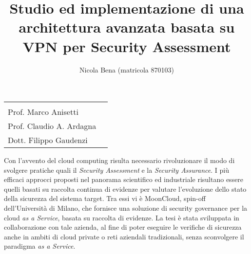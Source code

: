 \documentclass[10pt,a4paper]{article}
\begin{document}
        \title{\textbf{Studio ed implementazione di una architettura avanzata
        basata su VPN per Security Assessment}}
        \author{Nicola Bena (matricola 870103)}
        \date{}

        \maketitle

        \vspace{0.5cm}

        \begin{minipage}{\linewidth}
            \begin{tabular}{l r}
                \begin{minipage}[t]{.4\linewidth}
                    \begin{flushleft}
                        {%
                            RELATORE\\[.15cm]
                            Prof. Marco Anisetti
                        }
                    \end{flushleft}
                \end{minipage}
                &
                \begin{minipage}[t]{.53\linewidth}
                    \begin{flushright}
                        {%
                            CORRELATORI\\[.15cm]
                            Prof. Claudio A. Ardagna\\[.1cm]
                            Dott. Filippo Gaudenzi
                        }
                    \end{flushright}
                \end{minipage}
            \end{tabular}
        \end{minipage}

        \vspace{2cm}

        Con l'avvento del cloud computing risulta necessario rivoluzionare il modo di svolgere pratiche quali il
        \textit{Security Assessment} e la \textit{Security Assurance}. I più efficaci approcci
        proposti nel panorama scientifico ed industriale risultano essere quelli basati su raccolta continua
        di evidenze per valutare l'evoluzione dello stato della sicurezza del sistema target.
        Tra essi vi è MoonCloud, spin-off dell'Università di Milano, che fornisce una soluzione di
        security governance per la cloud \textit{as a Service}, basata su raccolta di evidenze.
        La tesi è stata sviluppata in collaborazione con tale azienda, al fine di poter eseguire
        le verifiche di sicurezza anche in ambiti di cloud private o reti aziendali tradizionali,
        senza sconvolgere il paradigma \textit{as a Service}. 
\end{document}
